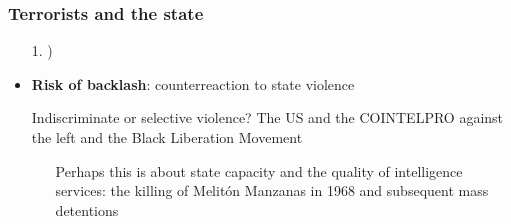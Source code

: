 \documentclass[aspectratio=43]{beamer}
\begin{document}
\begin{frame}
\frametitle{Terrorists and the state}
\centering

\begin{itemize}
  \item[1.] {})
  \item<2-> \textbf{Risk of backlash}: counterreaction to state violence
  \item[\textcolor{white}{\textbullet}] {\color{white} Indiscriminate or selective violence? The US and the COINTELPRO against the left and the Black Liberation Movement}
  \begin{itemize}\color{white}
    \item[\textcolor{white}{\textbullet}] Perhaps this is about state capacity and the quality of intelligence services: the killing of Melitón Manzanas in 1968 and subsequent mass detentions
  \end{itemize}
\end{itemize}

\end{frame}
\end{document}
